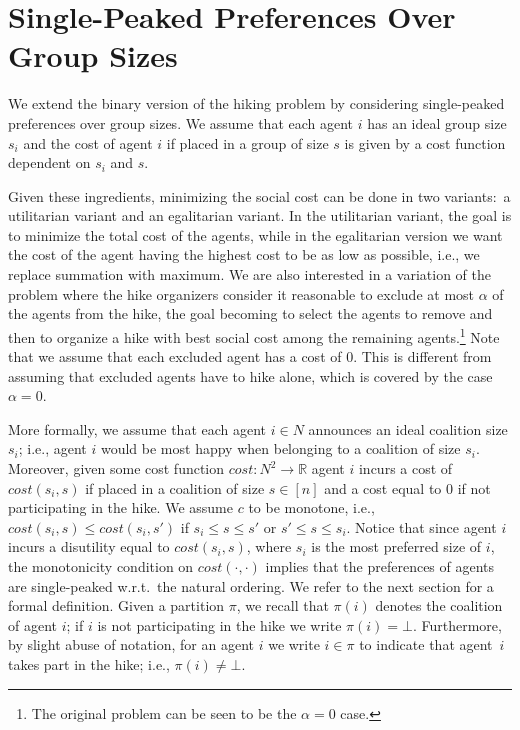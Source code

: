 \documentclass[a4paper,UKenglish,cleveref, autoref, thm-restate]{lipics-v2021}
\newcommand{\cost}{\mathit{cost}}
\begin{document}

\section{Single-Peaked Preferences Over Group Sizes}\label{sec:distanceMin}

We extend the binary version of the hiking problem by considering single-peaked preferences over group sizes. We assume that each agent $i$ has an ideal group size $s_i$ and the cost of agent $i$ if placed in a group of size $s$ is given by a cost function dependent on $s_i$ and $s$.

Given these ingredients, minimizing the social cost can be done in two variants:~a utilitarian variant and an egalitarian variant. In the utilitarian variant, the goal is to minimize the total cost of the agents, while in the egalitarian version we want the cost of the agent having the highest cost to be as low as possible, i.e., we replace summation with maximum. We are also interested in a variation of the problem where the hike organizers consider it reasonable to exclude at most $\alpha$ of the agents from the hike, the goal becoming to select the agents to remove and then to organize a hike with best social cost among the remaining agents.\footnote{The original problem can be seen to be the $\alpha = 0$ case.} Note that we assume that each excluded agent has a cost of $0$. This is different from assuming that excluded agents have to hike alone, which is covered by the case $\alpha=0$.

More formally, we assume that each agent $i \in N$ announces an ideal coalition size $s_i$; i.e., agent $i$ would be most happy when belonging to a coalition of size $s_i$. 
Moreover, given some cost function $\cost: N^2 \rightarrow \mathbb{R}$ agent $i$ incurs a cost of $\cost(s_i,s)$ if placed in a coalition of size $s \in [n]$ and a cost equal to $0$ if not participating in the hike. We assume $c$ to be monotone, i.e., $\cost(s_i,s) \leq \cost(s_i,s')$ if $s_i \leq s \leq s'$ or $s' \leq s \leq s_i$.  Notice that since agent $i$ incurs a disutility equal to $\cost(s_i,s)$, where $s_i$ is the most preferred size of $i$, the monotonicity condition on $\cost(\cdot, \cdot)$ implies that the preferences of agents are single-peaked w.r.t.\ the natural ordering. We refer to the next section for a formal definition.
Given a partition $\pi$, we recall that $\pi(i)$ denotes the coalition of agent $i$; if $i$ is not participating in the hike we write $\pi(i)=\bot$. Furthermore, by slight abuse of notation, for an agent $i$ we write $i \in \pi$ to indicate that agent~$i$ takes part in the hike; i.e., $\pi(i) \neq \bot.$
\end{document}
